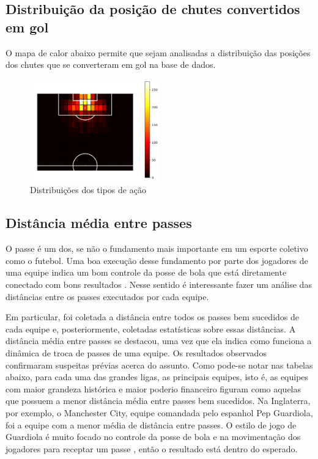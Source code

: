 \documentclass{article}
\begin{document}
\subsection{Distribuição da posição de chutes convertidos em gol}

O mapa de calor abaixo permite que sejam analisadas a distribuição das posições
dos chutes que se converteram em gol
na base de dados.

\begin{figure}[H]
	\centering
	\includegraphics[width=0.5\textwidth]{images/goal_position_heatmap.png}
	\caption{Distribuições dos tipos de ação}
	\label{fig:heatmap_goals}
\end{figure}

\subsection{Distância média entre passes}

O passe é um dos, se não o fundamento mais importante em um esporte coletivo
como o futebol. Uma boa execução desse fundamento por parte dos jogadores
de uma equipe indica um bom controle da posse de bola que está diretamente
conectado com bons resultados \cite{cox2022linhas}. Nesse sentido é
interessante fazer um análise
das distâncias entre os passes
executados por cada equipe.

Em particular, foi coletada a distância entre todos os passes bem sucedidos de
cada equipe e, posteriormente, coletadas estatísticas sobre essas distâncias. A
distância média
entre passes se destacou, uma vez que ela indica como funciona a dinâmica de
troca de passes de uma equipe. Os resultados observados confirmaram suspeitas
prévias acerca do assunto.
Como pode-se notar nas tabelas abaixo, para cada uma das grandes ligas, as
principais equipes, isto é, as equipes com maior grandeza histórica e maior
poderio financeiro figuram como aquelas
que possuem a menor distância média entre passes bem sucedidos. Na Inglaterra,
por exemplo, o Manchester City, equipe comandada pelo espanhol Pep Guardiola,
foi a equipe com a menor média
de distância entre passes. O estilo de jogo de Guardiola é muito focado no
controle da posse de bola e na movimentação dos jogadores para receptar um
passe \cite{terzis2023pep}, então o resultado está dentro do
esperado.
\end{document}
